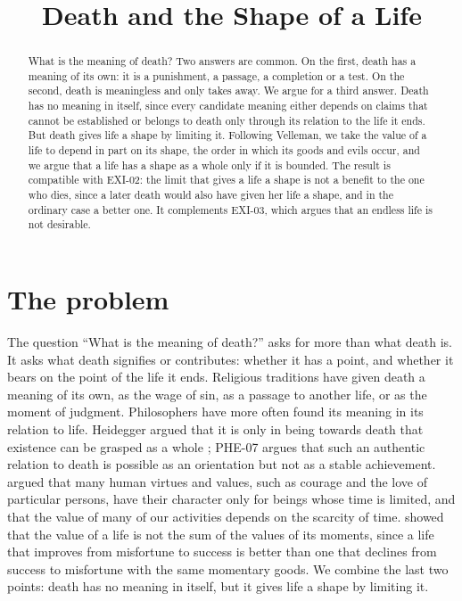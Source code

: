 \documentclass{situationist-preprint}
\title{Death and the Shape of a Life}
\begin{document}
\maketitle

\begin{abstract}
What is the meaning of death? Two answers are common. On the first, death has a meaning of its own: it is a punishment, a passage, a completion or a test. On the second, death is meaningless and only takes away. We argue for a third answer. Death has no meaning in itself, since every candidate meaning either depends on claims that cannot be established or belongs to death only through its relation to the life it ends. But death gives life a shape by limiting it. Following Velleman, we take the value of a life to depend in part on its shape, the order in which its goods and evils occur, and we argue that a life has a shape as a whole only if it is bounded. The result is compatible with EXI-02: the limit that gives a life a shape is not a benefit to the one who dies, since a later death would also have given her life a shape, and in the ordinary case a better one. It complements EXI-03, which argues that an endless life is not desirable.
\end{abstract}

\section{The problem}

The question \enquote{What is the meaning of death?} asks for more than what death is. It asks what death signifies or contributes: whether it has a point, and whether it bears on the point of the life it ends. Religious traditions have given death a meaning of its own, as the wage of sin, as a passage to another life, or as the moment of judgment. Philosophers have more often found its meaning in its relation to life. Heidegger argued that it is only in being towards death that existence can be grasped as a whole \citep[\S\S 46--53]{Heidegger1927}; PHE-07 argues that such an authentic relation to death is possible as an orientation but not as a stable achievement. \citet{Nussbaum1989} argued that many human virtues and values, such as courage and the love of particular persons, have their character only for beings whose time is limited, and \citet{Scheffler2013} that the value of many of our activities depends on the scarcity of time. \citet{Velleman1991} showed that the value of a life is not the sum of the values of its moments, since a life that improves from misfortune to success is better than one that declines from success to misfortune with the same momentary goods. We combine the last two points: death has no meaning in itself, but it gives life a shape by limiting it.
\end{document}
